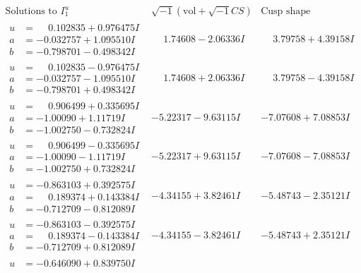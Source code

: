 \documentclass[1p]{elsarticle_modified}
\theoremstyle{definition}
\newcommand{\I}{\sqrt{-1}}
\begin{document}
$$\begin{array}{c|c|c}  
\text{Solutions to }I^u_{1}& \I (\text{vol} + \sqrt{-1}CS) & \text{Cusp shape}\\
 \hline 
\begin{aligned}
u &= \phantom{-}0.102835 + 0.976475 I \\
a &= -0.032757 + 1.095510 I \\
b &= -0.798701 - 0.498342 I\end{aligned}
 & \phantom{-}1.74608 - 2.06336 I & \phantom{-}3.79758 + 4.39158 I \\ \hline\begin{aligned}
u &= \phantom{-}0.102835 - 0.976475 I \\
a &= -0.032757 - 1.095510 I \\
b &= -0.798701 + 0.498342 I\end{aligned}
 & \phantom{-}1.74608 + 2.06336 I & \phantom{-}3.79758 - 4.39158 I \\ \hline\begin{aligned}
u &= \phantom{-}0.906499 + 0.335695 I \\
a &= -1.00090 + 1.11719 I \\
b &= -1.002750 - 0.732824 I\end{aligned}
 & -5.22317 - 9.63115 I & -7.07608 + 7.08853 I \\ \hline\begin{aligned}
u &= \phantom{-}0.906499 - 0.335695 I \\
a &= -1.00090 - 1.11719 I \\
b &= -1.002750 + 0.732824 I\end{aligned}
 & -5.22317 + 9.63115 I & -7.07608 - 7.08853 I \\ \hline\begin{aligned}
u &= -0.863103 + 0.392575 I \\
a &= \phantom{-}0.189374 + 0.143384 I \\
b &= -0.712709 - 0.812089 I\end{aligned}
 & -4.34155 + 3.82461 I & -5.48743 - 2.35121 I \\ \hline\begin{aligned}
u &= -0.863103 - 0.392575 I \\
a &= \phantom{-}0.189374 - 0.143384 I \\
b &= -0.712709 + 0.812089 I\end{aligned}
 & -4.34155 - 3.82461 I & -5.48743 + 2.35121 I \\ \hline\begin{aligned}
u &= -0.646090 + 0.839750 I \\

\end{aligned}
\end{array}$$
\end{document}
